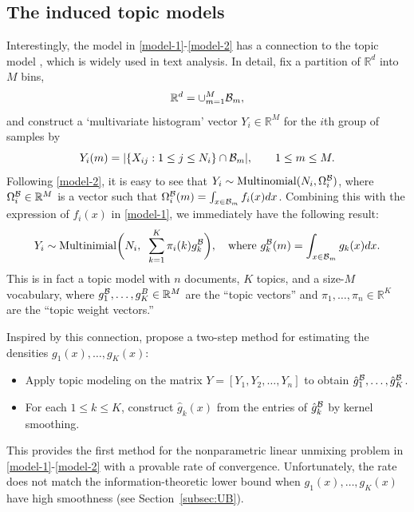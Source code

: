 \documentclass[preprint,11pt]{article}
\numberwithin{equation}{section}
\newcommand{\beq}{\begin{equation}}
\newcommand{\eeq}{\end{equation}}
\begin{document}
\subsection{The induced topic models} \label{subsec:NMDE-to-TM}
Interestingly, the model in \eqref{model-1}-\eqref{model-2} has a connection to the topic model \citep{blei2003latent}, which is widely used in text analysis. In detail, fix a partition of $\mathbb{R}^d$ into $M$ bins, 
\beq \label{def-bins}
\mathbb{R}^d=\cup_{m=1}^M {\cal B}_m,
\eeq
and construct a `multivariate histogram' vector $Y_i\in\mathbb{R}^M$ for the $i$th group of samples by
\beq\label{def-Y}
Y_i(m)= |\{X_{ij}:1\leq j\leq N_i\}\cap {\cal B}_m|, \qquad 1\leq m\leq M. 
\eeq
Following \eqref{model-2}, it is easy to see that $Y_i \sim\mathrm{Multinomial}(N_i, \Omega^{\cal B}_i)$, where $\Omega^{\cal B}_i\in\mathbb{R}^M$ is a vector such that $\Omega^{\cal B}_i(m) = \int_{x\in {\cal B}_m}f_i(x)dx$. Combining this with the expression of $f_i(x)$ in \eqref{model-1}, we immediately have the following result: 
\beq \label{NMDE-to-TM}
Y_i\sim \mathrm{Multinimial}\biggl(N_i,\;\; \sum_{k=1}^K \pi_i(k)g^{\cal B}_k\biggr), \quad \mbox{where } g^{\cal B}_k(m)= \int_{x\in {\cal B}_m} g_k(x)dx. 
\eeq
This is in fact a topic model with $n$ documents, $K$ topics, and a size-$M$ vocabulary, where  $g_1^{\cal B}, \ldots, g_K^{B}\in\mathbb{R}^M$ are the ``topic vectors'' and $\pi_1, \ldots,\pi_n\in\mathbb{R}^K$ are the ``topic weight vectors.''   

Inspired by this connection, \cite{austern2025poisson} propose a two-step method for estimating the densities $g_1(x), \ldots, g_K(x)$:
\begin{itemize}
\item Apply topic modeling on the matrix $Y=[Y_1, Y_2,\ldots, Y_n]$ to obtain $\hat{g}_1^{\cal B}, \ldots, \hat{g}_K^{\cal B}$.
\item For each $1\leq k\leq K$, construct $\hat{g}_k(x)$ from the entries of $\hat{g}_k^{\cal B}$ by kernel smoothing. 
\end{itemize}
This provides the first method for the nonparametric linear unmixing problem in \eqref{model-1}-\eqref{model-2} with a provable rate of convergence. 
%
%
%
Unfortunately, the rate does not match the information-theoretic lower bound when $g_1(x), \ldots, g_K(x)$ have high smoothness (see Section~\ref{subsec:UB}). 
\end{document}
